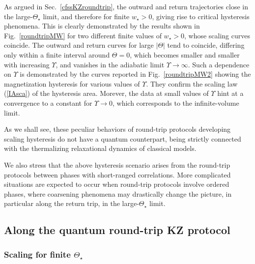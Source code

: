 As argued in Sec.~\ref{cfssKZroundtrip}, the outward and return
trajectories close in the large-$\Theta_\star$ limit, and therefore
for finite $w_\star>0$, giving rise to critical hysteresis phenomena.
This is clearly demonstrated by the results shown in
Fig.~\ref{roundtripMW} for two different finite values of $w_\star>0$,
whose scaling curves coincide. The outward and return curves for large
$|\Theta|$ tend to coincide, differing only within a finite interval
around $\Theta=0$, which becomes smaller and smaller with increasing
$\Upsilon$, and vanishes in the adiabatic limit
$\Upsilon\to\infty$. Such a dependence on $\Upsilon$ is demonstrated
by the curves reported in Fig.~\ref{roundtripMW2} showing the
magnetization hysteresis for various values of $\Upsilon$. They
confirm the scaling law (\ref{IAsca}) of the hysteresis area. Morever,
the data at small values of $\Upsilon$ hint at a convergence to a
constant for $\Upsilon\to 0$, which corresponds to the infinite-volume
limit.

As we shall see, these peculiar behaviors of round-trip protocols
developing scaling hysteresis do not have a quantum counterpart, being
strictly connected with the thermalizing relaxational dynamics of
classical models.


We also stress that the above hysteresis scenario arises from the
round-trip protocols between phases with short-ranged
correlations. More complicated situations are expected to occur when
round-trip protocols involve ordered phases, where coarsening
phenomena may drastically change the picture, in particular
along the return trip, in the large-$\Theta_\star$ limit.

\subsection{Along the quantum round-trip KZ protocol}
\label{qroundtrip}

\subsubsection{Scaling for finite $\Theta_\star$}
  \label{scafinthetastar}

